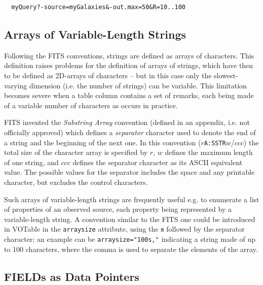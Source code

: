 \documentclass[11pt,a4paper]{ivoa}
\let\fg=\color
\def\attr#1{{\tt{\fg{DarkRed}#1}}}
\def\attrval#1#2{{\tt{\fg{DarkRed}#1}="{\fg{DarkPurple}#2}"}}
\def\elemdef#1#2{{\tt\fg{blue}<}{\tt{\fg{DarkRed}#1}#2}{\tt\fg{blue}>}}
\begin{document}
{{{\begin{verbatim}
  myQuery?-source=myGalaxies&-out.max=50&R=10..100
\end{verbatim}


\subsection{Arrays of Variable-Length Strings}
\label{sec:arraystring}
Following the FITS conventions, strings are defined as arrays of
characters. This definition raises problems for the definition
of arrays of strings, which have then to be defined as 2D-arrays
of characters -- but in this case only the slowest-varying dimension
(i.e. the number of strings) can be variable. %
This limitation becomes severe when a table column contains a set
of remarks, each being made of a variable number of characters as
occurs in practice.

FITS invented the {\em Substring Array} convention (defined in an appendix,
i.e. not officially approved) which defines a {\em separator} character
used to denote the end of a string and the beginning of the next one.
In this convention ($r${\tt A:SSTR}$w$/$ccc$) the total size of the character
array is specified by $r$, $w$ defines the maximum length of one string,
and $ccc$ defines the separator character as its ASCII equivalent value.
The possible values for the separator includes the space and any printable
character, but excludes the control characters.

Such arrays of variable-length strings are frequently useful e.g.
to enumerate a list of properties of an observed source, each property being
represented by a variable-length string.
A convention similar to the FITS one could be introduced in
VOTable in the \attr{arraysize}
attribute, using the {\bf s} followed by the separator character;
an example can be \attrval{arraysize}{100s,}
indicating a string made of up to 100 characters, where the comma
is used to separate the elements of the array.

\subsection{FIELDs as Data Pointers}
\label{location}

}}}
\end{document}
